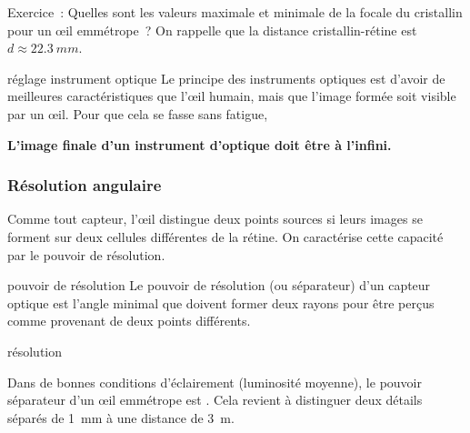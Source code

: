 \documentclass[../main/main.tex]{subfiles}
\begin{document}
\begin{NCexem}[width=\linewidth]{Exercice~:}
    Quelles sont les valeurs maximale et minimale de la focale du cristallin
    pour un œil emmétrope~? On rappelle que la distance cristallin-rétine est $d
    \approx \SI{22.3}{mm}$.
    \tcblower
    \vspace{4cm}
\end{NCexem}

\begin{impl}[label=impl:instrument_opt]{réglage instrument optique}
    Le principe des instruments optiques est d'avoir de meilleures
    caractéristiques que l'œil humain, mais que l'image formée soit visible par
    un œil. Pour que cela se fasse sans fatigue,
    \begin{center}
        \bfseries L'image finale d'un instrument d'optique doit être à l'infini.
    \end{center}
\end{impl}

\subsubsection{Résolution angulaire}
Comme tout capteur, l'œil distingue deux points sources si leurs images se
forment sur deux cellules différentes de la rétine. On caractérise cette
capacité par le pouvoir de résolution.
\begin{tcbraster}[raster columns=2, raster equal height=rows]
    \begin{defi}[label=def:resolu]{pouvoir de résolution}
        Le pouvoir de résolution (ou séparateur) d'un capteur optique est l'angle
        minimal que doivent former deux rayons pour être perçus comme provenant de
        deux points différents.
    \end{defi}
    \begin{odgr}[label=odgr:resolu]{résolution}

        Dans de bonnes conditions d'éclairement (luminosité moyenne), le pouvoir
        séparateur d'un œil emmétrope est . Cela revient à distinguer deux détails séparés de
        \SI{1}{mm} à une distance de \SI{3}{m}.
    \end{odgr}
\end{tcbraster}
\end{document}
